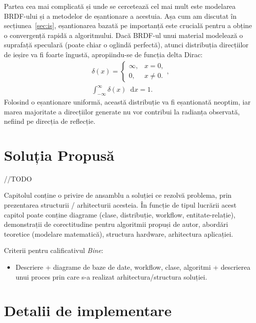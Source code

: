 \documentclass[12pt,a4paper]{report}
\newcommand*\diff{\mathop{}\!\mathrm{d}}
\numberwithin{equation}{section} %
\begin{document}
Partea cea mai complicată și unde se cercetează cel mai mult este modelarea
BRDF-ului și a metodelor de eșantionare a acestuia. Așa cum am discutat în
secțiunea~\ref{sec:is}, eșantionarea bazată pe importanță este crucială pentru
a obține o convergență rapidă a algoritmului. Dacă BRDF-ul unui material modelează
o suprafață speculară (poate chiar o oglindă perfectă), atunci distribuția
direcțiilor de ieșire va fi foarte îngustă, apropiindu-se de funcția delta Dirac:
\begin{equation}
	\begin{aligned}
		 & \delta(x) = \begin{cases}
			               \infty, & x = 0,    \\
			               0,      & x \neq 0.
		               \end{cases},                \\
		 & \int_{-\infty}^{\infty} \delta(x) \diff x = 1.
	\end{aligned}
\end{equation}
Folosind o eșantionare uniformă, această distribuție va fi eșantionată neoptim,
iar marea majoritate a direcțiilor generate nu vor contribui la radianța observată,
nefiind pe direcția de reflecție.

\chapter{\label{sec:solutie}Soluția Propusă}

//TODO

Capitolul conține o privire de ansamblu a soluției ce rezolvă problema, prin prezentarea structurii / arhitecturii acesteia. În funcție de tipul lucrării acest capitol poate conține diagrame (clase, distribuție, workflow, entitate-relație), demonstrații de corectitudine pentru algoritmii propuși de autor, abordări teoretice (modelare matematică), structura hardware, arhitectura aplicației.

Criterii pentru calificativul \textit{Bine}:
\begin{itemize}
	\item 	Descriere + diagrame de baze de date, workflow, clase, algoritmi + descrierea unui proces prin care s-a realizat arhitectura/structura soluției.
\end{itemize}

\chapter{\label{sec:implementare}Detalii de implementare}
\end{document}
